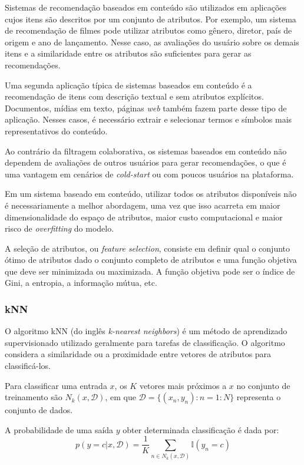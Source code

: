 Sistemas de recomendação baseados em conteúdo são utilizados em aplicações cujos
itens são descritos por um conjunto de atributos. Por exemplo, um sistema de
recomendação de filmes pode utilizar atributos como gênero, diretor, país de
origem e ano de lançamento. Nesse caso, as avaliações do usuário sobre os demais
itens e a similaridade entre os atributos são suficientes para gerar as
recomendações.

Uma segunda aplicação típica de sistemas baseados em conteúdo é a recomendação
de itens com descrição textual e sem atributos explícitos. Documentos,
mídias em texto, páginas \textit{web} também fazem parte desse tipo de
aplicação. Nesses casos, é necessário extrair e selecionar termos e símbolos
mais representativos do conteúdo.


Ao contrário da filtragem colaborativa, os sistemas baseados em conteúdo não
dependem de avaliações de outros usuários para gerar recomendações, o que é uma
vantagem em cenários de \textit{cold-start} ou com poucos usuários na
plataforma.

Em um sistema baseado em conteúdo,
utilizar todos os atributos disponíveis não é necessariamente a melhor
abordagem, uma vez que isso acarreta em maior dimensionalidade do espaço de
atributos, maior custo computacional e maior risco de \textit{overfitting} do
modelo.


A seleção de atributos, ou \textit{feature selection}, consiste em definir qual
o conjunto ótimo de atributos dado o conjunto completo de
atributos e uma função objetiva que deve ser minimizada ou maximizada. A função
objetiva pode ser o índice de Gini, a entropia, a informação mútua, etc.

\subsubsection{kNN}
O algoritmo kNN (do inglês \textit{k-nearest neighbors}) é um método de
aprendizado supervisionado utilizado geralmente para tarefas de classificação. O
algoritmo considera a similaridade ou a proximidade entre vetores de atributos
para classificá-los.

Para classificar uma entrada $x$, os $K$ vetores mais próximos a $x$ no conjunto
de treinamento são $N_k(x,\mathcal{D})$, em que $\mathcal{D} = \{ (x_n, y_n) : n=1: N \}$
representa o conjunto de dados.

A probabilidade de uma saída $y$ obter determinada classificação é dada por:
\begin{equation}
    p(y=c|x, \mathcal{D}) = \frac{1}{K} \sum_{n \in N_k (x, \mathcal{D})} \mathbb{I}(y_n = c)
\end{equation}



